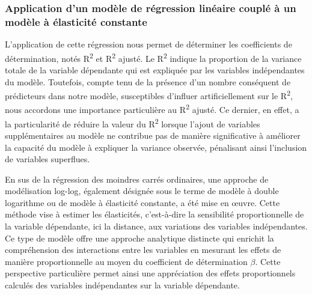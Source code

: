 \begin{refsegment}
\subsubsection*{Application d'un modèle de régression linéaire couplé à un modèle à élasticité constante
    \label{chap5:modeles-OLS-log-log}
    }

L'application de cette régression nous permet de déterminer les coefficients de détermination, notés R\textsuperscript{2} et R\textsuperscript{2} ajusté. Le R\textsuperscript{2} indique la proportion de la variance totale de la variable dépendante qui est expliquée par les variables indépendantes du modèle. Toutefois, compte tenu de la présence d'un nombre conséquent de prédicteurs dans notre modèle, susceptibles d'influer artificiellement sur le R\textsuperscript{2}, nous accordons une importance particulière au R\textsuperscript{2} ajusté. Ce dernier, en effet, a la particularité de réduire la valeur du R\textsuperscript{2} lorsque l'ajout de variables supplémentaires au modèle ne contribue pas de manière significative à améliorer la capacité du modèle à expliquer la variance observée, pénalisant ainsi l'inclusion de variables superflues.%

En sus de la régression des moindres carrés ordinaires, une approche de modélisation log-log, également désignée sous le terme de modèle à double logarithme ou de modèle à élasticité constante, a été mise en œuvre. Cette méthode vise à estimer les élasticités, c'est-à-dire la sensibilité proportionnelle de la variable dépendante, ici la distance, aux variations des variables indépendantes. Ce type de modèle offre une approche analytique distincte qui enrichit la compréhension des interactions entre les variables en mesurant les effets de manière proportionnelle au moyen du coefficient de détermination \(\beta\). Cette perspective particulière permet ainsi une appréciation des effets proportionnels calculés des variables indépendantes sur la variable dépendante.%


\end{refsegment}
